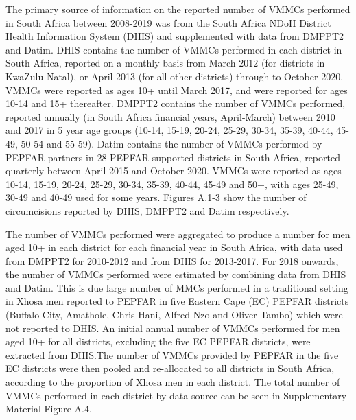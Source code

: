 \documentclass{article}
\begin{document}
\begin{appendix}
\noindent The primary source of information on the reported number of VMMCs performed in South Africa between 2008-2019 was from the South Africa NDoH District Health Information System (DHIS) and supplemented with data from DMPPT2 and Datim. DHIS contains the number of VMMCs performed in each district in South Africa, reported on a monthly basis from March 2012 (for districts in KwaZulu-Natal), or April 2013 (for all other districts) through to October 2020. VMMCs were reported as ages 10+ until March 2017, and were reported for ages 10-14 and 15+ thereafter. DMPPT2 contains the number of VMMCs performed, reported annually (in South Africa financial years, April-March) between 2010 and 2017 in 5 year age groups (10-14, 15-19, 20-24, 25-29, 30-34, 35-39, 40-44, 45-49, 50-54 and 55-59). Datim contains the number of VMMCs performed by PEPFAR partners in 28 PEPFAR supported districts in South Africa, reported quarterly between April 2015 and October 2020. VMMCs were reported as ages 10-14, 15-19, 20-24, 25-29, 30-34, 35-39, 40-44, 45-49 and 50+, with ages 25-49, 30-49 and 40-49 used for some years. Figures A.1-3 show the number of circumcisions reported by DHIS, DMPPT2 and Datim respectively.  

\noindent The number of VMMCs performed were aggregated to produce a number for men aged 10+ in each district for each financial year in South Africa, with data used from DMPPT2 for 2010-2012 and from DHIS for 2013-2017. For 2018 onwards, the number of VMMCs performed were estimated by combining data from DHIS and Datim. This is due large number of MMCs performed in a traditional setting in Xhosa men reported to PEPFAR in five Eastern Cape (EC) PEPFAR districts (Buffalo City, Amathole, Chris Hani, Alfred Nzo and Oliver Tambo) which were not reported to DHIS. An initial annual number of VMMCs performed for men aged 10+ for all districts, excluding the five EC PEPFAR districts, were extracted from DHIS.The number of VMMCs provided by PEPFAR in the five EC districts were then pooled and re-allocated to all districts in South Africa, according to the proportion of Xhosa men in each district. The total number of VMMCs performed in each district by data source can be seen in Supplementary Material Figure A.4. 




\end{appendix}
\end{document}

